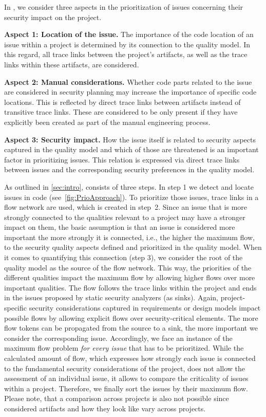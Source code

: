 	    In \appr{}, we consider three aspects in the prioritization of issues concerning their security impact on the project.
	    \begin{description}
	        \item \textbf{Aspect 1: Location of the issue.} The importance of the code location of an issue within a project is determined by its connection to the quality model. In this regard, all trace links between the project's artifacts, as well as the trace links within these artifacts, are considered.
	        \item \textbf{Aspect 2: Manual considerations.} Whether code parts related to the issue are considered in security planning may increase the importance of specific code locations. This is reflected by direct trace links between artifacts instead of transitive trace links. These are considered to be only present if they have explicitly been created as part of the manual engineering process.
	        \item \textbf{Aspect 3: Security impact.} How the issue itself is related to security aspects captured in the quality model and which of those are threatened is an important factor in prioritizing issues. This relation is expressed via direct trace links between issues and the corresponding security preferences in the quality model.
	    \end{description}

As outlined in \autoref{sec:intro}, \appr{} consists of three steps.
In step 1 we detect and locate issues in code (see~\autoref{fig:PrioApproach}).
To prioritize those issues, trace links in a flow network are used, which is created in step~2.
Since an issue that is more strongly connected to the qualities relevant to a project may have a stronger impact on them, the basic assumption is that an issue is considered more important the more strongly it is connected, i.e., the higher the maximum flow, to the security quality aspects defined and prioritized in the quality model.
When it comes to quantifying this connection (step 3), we consider the root of the quality model as the source of the flow network.
This way, the priorities of the different qualities impact the maximum flow by allowing higher flows over more important qualities.
The flow follows the trace links within the project and ends in the issues proposed by static security analyzers (as sinks).
Again, project-specific security considerations captured in requirements or design models impact possible flows by allowing explicit flows over security-critical elements.
The more flow tokens can be propagated from the source to a sink, the more important we consider the corresponding issue.
Accordingly, we face an instance of the maximum flow problem \emph{for every issue} that has to be prioritized.
While the calculated amount of flow, which expresses how strongly each issue is connected to the fundamental security considerations of the project, does not allow the assessment of an individual issue, it allows to compare the criticality of issues within a project.
Therefore, we finally sort the issues by their maximum flow.
Please note, that a comparison across projects is also not possible since considered artifacts and how they look like vary across projects.

